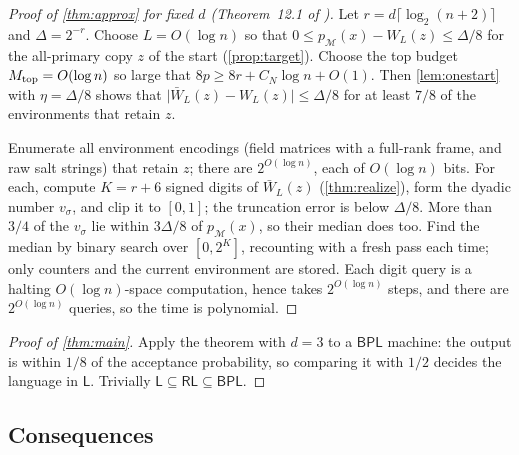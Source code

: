 \documentclass[11pt]{article}
\theoremstyle{definition}
\theoremstyle{remark}
\newcommand{\abs}[1]{\lvert #1\rvert}
\newcommand{\Lc}{\mathsf L}
\newcommand{\RL}{\mathsf{RL}}
\newcommand{\BPL}{\mathsf{BPL}}
\begin{document}
\begin{proof}[Proof of \cref{thm:approx} for fixed $d$ (Theorem~12.1 of \cite{OpenAI-BPL})]
Let $r=d\lceil\log_2(n+2)\rceil$ and $\Delta=2^{-r}$. Choose $L=O(\log n)$ so that
$0\le p_{\mathcal M}(x)-W_L(z)\le\Delta/8$ for the all-primary copy $z$ of the start
(\cref{prop:target}). Choose the top budget $M_{\rm top}=O(\log n)$ so large that
$8p\ge8r+C_N\log n+O(1)$. Then \cref{lem:onestart} with $\eta=\Delta/8$ shows that
$\abs{\bar W_L(z)-W_L(z)}\le\Delta/8$ for at least $7/8$ of the environments that
retain $z$.

Enumerate all environment encodings (field matrices with a full-rank frame, and
raw salt strings) that retain $z$; there are $2^{O(\log n)}$, each of $O(\log n)$ bits.
For each, compute $K=r+6$ signed digits of $\bar W_L(z)$ (\cref{thm:realize}),
form the dyadic number $v_\sigma$, and clip it to $[0,1]$; the truncation error is
below $\Delta/8$. More than $3/4$ of the $v_\sigma$ lie within $3\Delta/8$ of
$p_{\mathcal M}(x)$, so their median does too. Find the median by binary search over
$[0,2^K]$, recounting with a fresh pass each time; only counters and the current
environment are stored. Each digit query is a halting $O(\log n)$-space
computation, hence takes $2^{O(\log n)}$ steps, and there are $2^{O(\log n)}$
queries, so the time is polynomial.
\end{proof}

\begin{proof}[Proof of \cref{thm:main}]
Apply the theorem with $d=3$ to a $\BPL$ machine: the output is within $1/8$ of the
acceptance probability, so comparing it with $1/2$ decides the language in
$\Lc$. Trivially $\Lc\subseteq\RL\subseteq\BPL$.
\end{proof}

\subsection{Consequences}\label{sec:consequences}
\end{document}
